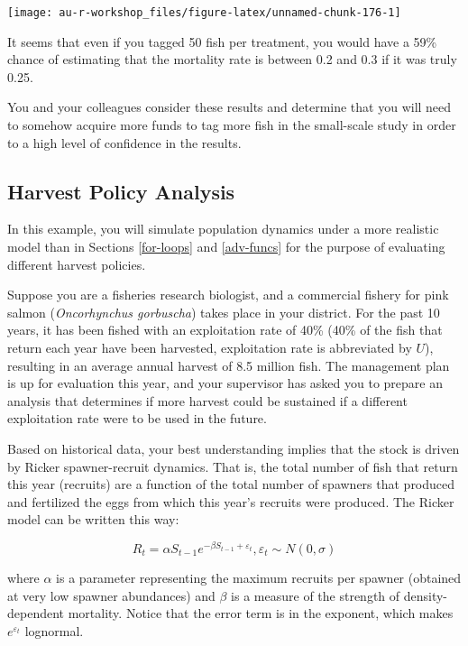 \documentclass[]{book}
\theoremstyle{definition}
\theoremstyle{definition}
\theoremstyle{definition}
\theoremstyle{remark}
\begin{document}
\begin{center}\texttt{[image: au-r-workshop\_files/figure-latex/unnamed-chunk-176-1]} \end{center}

It seems that even if you tagged 50 fish per treatment, you would have a
59\% chance of estimating that the mortality rate is between 0.2 and 0.3
if it was truly 0.25.

You and your colleagues consider these results and determine that you
will need to somehow acquire more funds to tag more fish in the
small-scale study in order to a high level of confidence in the results.

\subsection{Harvest Policy Analysis}\label{harv-ex}

In this example, you will simulate population dynamics under a more
realistic model than in Sections \ref{for-loops} and \ref{adv-funcs} for
the purpose of evaluating different harvest policies.

Suppose you are a fisheries research biologist, and a commercial fishery
for pink salmon (\emph{Oncorhynchus gorbuscha}) takes place in your
district. For the past 10 years, it has been fished with an exploitation
rate of 40\% (40\% of the fish that return each year have been
harvested, exploitation rate is abbreviated by \(U\)), resulting in an
average annual harvest of 8.5 million fish. The management plan is up
for evaluation this year, and your supervisor has asked you to prepare
an analysis that determines if more harvest could be sustained if a
different exploitation rate were to be used in the future.

Based on historical data, your best understanding implies that the stock
is driven by Ricker spawner-recruit dynamics. That is, the total number
of fish that return this year (recruits) are a function of the total
number of spawners that produced and fertilized the eggs from which this
year's recruits were produced. The Ricker model can be written this way:

\begin{equation}
  R_t = \alpha S_{t-1} e^{-\beta S_{t-1} + \varepsilon_t} ,\varepsilon_t \sim N(0,\sigma)
\label{eq:ricker-ch4}
\end{equation}

where \(\alpha\) is a parameter representing the maximum recruits per
spawner (obtained at very low spawner abundances) and \(\beta\) is a
measure of the strength of density-dependent mortality. Notice that the
error term is in the exponent, which makes \(e^{\varepsilon_t}\)
lognormal.
\end{document}
